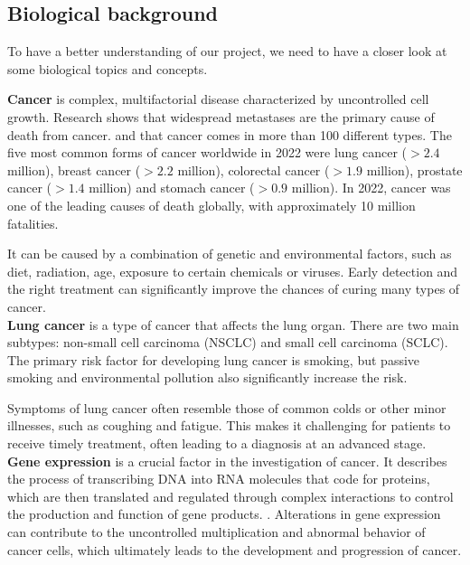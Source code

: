 \subsection{Biological background} \label{subsec:biological_background}
To have a better understanding of our project, we need to have a closer look at some biological topics and concepts.

\textbf{Cancer} is complex, multifactorial disease characterized by uncontrolled cell growth.
Research shows that widespread metastases are the primary cause of death from cancer\cite{who_cancer_fact_sheet}.
and that cancer comes in more than 100 different types\cite{nci_cancer_types}.
The five most common forms of cancer worldwide in 2022 were lung cancer ($>2.4$ million),
breast cancer ($>2.2$ million), colorectal cancer ($>1.9$ million), prostate cancer ($>1.4$ million) and
stomach cancer ($>0.9$ million).
In 2022, cancer was one of the leading causes of death globally,
with approximately 10 million fatalities\cite{ferlay2024global}.

It can be caused by a combination of genetic and environmental factors,
such as diet, radiation, age, exposure to certain chemicals or viruses\cite{nci_cancer_risk}.
Early detection and the right treatment can significantly improve the chances of curing many types of cancer.
\\

\textbf{Lung cancer} is a type of cancer that affects the lung organ.
There are two main subtypes: non-small cell carcinoma (NSCLC) and small cell carcinoma (SCLC)\cite{nci_lung_cancer_types}.
The primary risk factor for developing lung cancer is smoking,
but passive smoking and environmental pollution also significantly increase the risk\cite{nci_lung_cancer_types}.

Symptoms of lung cancer often resemble those of common colds or other minor illnesses,
such as coughing and fatigue.
This makes it challenging for patients to receive timely treatment, often leading to a diagnosis at an advanced stage\cite{who_lung_cancer}.
\\

\textbf{Gene expression} is a crucial factor in the investigation of cancer.
It describes the process of transcribing DNA into RNA molecules that code for proteins,
which are then translated and regulated through complex interactions to control the production and function of gene products.
\cite{nhi_gene_expression}.
Alterations in gene expression can contribute to the uncontrolled multiplication and abnormal behavior of cancer cells,
which ultimately leads to the development and progression of cancer\cite{ferlier2022regulation}.
\\

